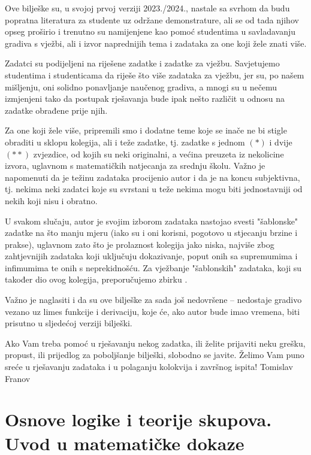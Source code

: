 \documentclass{book}
\begin{document}
Ove bilješke su, u svojoj prvoj verziji 2023./2024., nastale sa svrhom da budu popratna literatura za studente uz održane demonstrature, ali se od tada njihov opseg proširio i trenutno su namijenjene kao pomoć studentima u savladavanju gradiva s vježbi, ali i izvor naprednijih tema i zadataka za one koji žele znati više. 

Zadatci su podijeljeni na riješene zadatke i zadatke za vježbu. Savjetujemo studentima i studenticama da riješe što više zadataka za vježbu, jer su, po našem mišljenju, oni solidno ponavljanje naučenog gradiva, a mnogi su u nečemu izmjenjeni tako da postupak rješavanja bude ipak nešto različit u odnosu na zadatke obrađene prije njih.

Za one koji žele više, pripremili smo i dodatne teme koje se inače ne bi stigle obraditi u sklopu kolegija, ali i teže zadatke, tj. zadatke s jednom $(*)$ i dvije $(**)$ zvjezdice, od kojih su neki originalni, a većina preuzeta iz nekolicine izvora, uglavnom s matematičkih natjecanja za srednju školu. Važno je napomenuti da je težinu zadataka procijenio autor i da je na koncu subjektivna, tj. nekima neki zadatci koje su svrstani u teže nekima mogu biti jednostavniji od nekih koji nisu i obratno.

U svakom slučaju, autor je svojim izborom zadataka nastojao svesti "šablonske" zadatke na što manju mjeru (iako su i oni korisni, pogotovo u stjecanju brzine i prakse), uglavnom zato što je prolaznost kolegija jako niska, najviše zbog zahtjevnijih zadataka koji uključuju dokazivanje, poput onih sa supremumima i infimumima te onih s neprekidnošću. Za vježbanje "šablonskih" zadataka, koji su također dio ovog kolegija, preporučujemo zbirku \cite{8}.

Važno je naglasiti i da su ove bilješke za sada još nedovršene -- nedostaje gradivo vezano uz limes funkcije i derivaciju, koje će, ako autor bude imao vremena, biti prisutno u sljedećoj verziji bilješki.

Ako Vam treba pomoć u rješavanju nekog zadatka, ili želite prijaviti neku grešku, propust, ili prijedlog za poboljšanje bilješki, slobodno se javite. Želimo Vam puno sreće u rješavanju zadataka i u polaganju kolokvija i završnog ispita!
\flushright
\flushleft
\justifying
\noindent Tomislav Franov
\thispagestyle{empty}
\large
\pagestyle{fancy}
\fancyhead[RO, RE]{}
\chapter{Osnove logike i teorije skupova. Uvod u matematičke dokaze}
\end{document}
